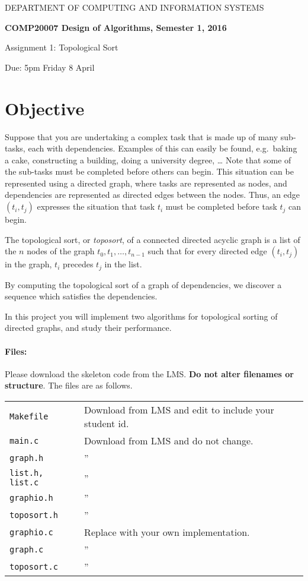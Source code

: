 \documentclass[11pt]{article}
\title{}
\date{}
\begin{document}
{\large
\begin{center}
DEPARTMENT OF COMPUTING AND INFORMATION SYSTEMS\vspace{2ex}

{\Large\bf
COMP20007 Design of Algorithms, Semester 1, 2016

Assignment 1: Topological Sort
}\vspace{2ex}

Due: 5pm Friday 8 April
\end{center}
}

\section*{Objective}

Suppose that you are undertaking a complex task that is made up of many sub-tasks, each with dependencies.
Examples of this can easily be found,
e.g.\ baking a cake, constructing a building, doing a university degree, \ldots
Note that some of the sub-tasks must be completed before others can begin.
This situation can be represented using a directed graph,
where tasks are represented as nodes,
and dependencies are represented as directed edges between the nodes.
Thus, an edge $(t_i, t_j)$ expresses the
situation that task $t_i$ must be completed before task $t_j$ can begin.

The topological sort, or \emph{toposort}, of a connected directed acyclic graph is a list of the $n$ nodes of the graph
$t_0, t_1,\ldots,t_{n-1}$ such that for every directed edge $(t_i, t_j)$ in the graph, $t_i$ precedes $t_j$ in the list.

By computing the topological sort of a graph of dependencies, we discover a sequence which satisfies the dependencies.

In this project you will implement two algorithms for topological sorting of directed graphs, and study their performance.

\paragraph{Files:}
Please download the skeleton code from the LMS\@.
{\bf Do not alter filenames or structure}.
The files are as follows.

\begin{center}
\begin{tabular}{ll}
\toprule
\texttt{Makefile} & Download from LMS and edit to include your student id.\\
\texttt{main.c} & Download from LMS and do not change.\\
\texttt{graph.h} & '' \\
\texttt{list.h, list.c} & '' \\
\texttt{graphio.h} & '' \\
\texttt{toposort.h} & '' \\
\midrule
\texttt{graphio.c} & Replace with your own implementation.\\
\texttt{graph.c} & '' \\
\texttt{toposort.c} & ''\\
\bottomrule
\end{tabular}
\end{center}
\end{document}
